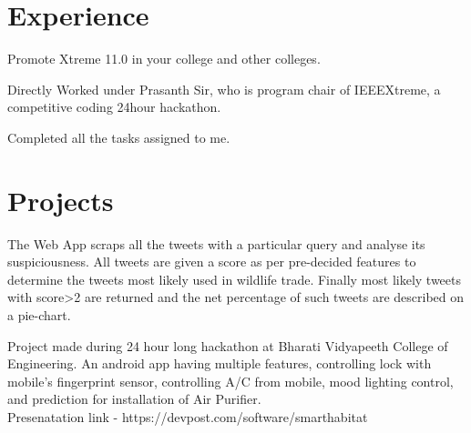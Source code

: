 \documentclass[]{deedy-resume-openfont}
\begin{document}
\begin{minipage}[t]{0.66\textwidth} 

\section{Experience }

\sectionsep


\vspace{\topsep} %
\begin{tightemize}
\item Promote Xtreme 11.0 in your college and other colleges.\item Directly Worked under Prasanth Sir, who is program chair of IEEEXtreme, a competitive coding 24hour hackathon. \item Completed all the tasks assigned to me. %
\end{tightemize}
\sectionsep



\section{Projects}

The Web App scraps all the tweets with a particular query and analyse its suspiciousness. All tweets are given a score as per pre-decided features to determine the tweets most likely used in wildlife trade. Finally most likely tweets with score>2 are returned and the net percentage of such tweets are described on a pie-chart.
\sectionsep

Project made during 24 hour long hackathon at Bharati Vidyapeeth College of Engineering. An android app having multiple features, controlling lock with mobile's fingerprint sensor, controlling A/C from mobile, mood lighting control, and prediction for installation of Air Purifier.\\ Presenatation link - https://devpost.com/software/smarthabitat
\sectionsep


\end{minipage}
\end{document}
